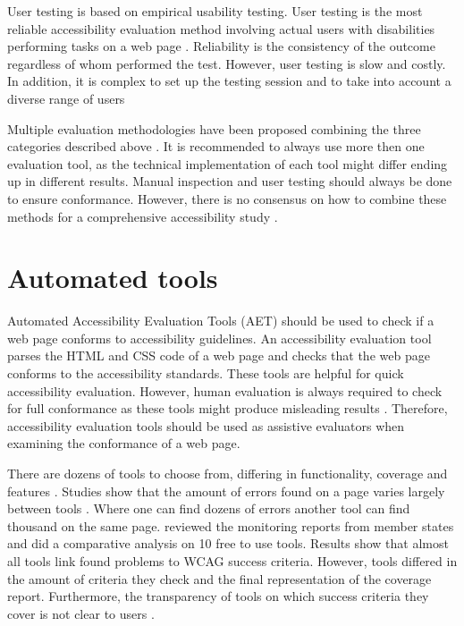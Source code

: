 User testing is based on empirical usability testing. User testing is the most reliable accessibility evaluation method involving actual users with disabilities performing tasks on a web page \citep[Chapter~26.2]{webaccessibility}. Reliability is the consistency of the outcome regardless of whom performed the test. However, user testing is slow and costly. In addition, it is complex to set up the testing session and to take into account a diverse range of users \citep{comparative_accessibility_methods}

Multiple evaluation methodologies have been proposed combining the three categories described above \citep[Chapter~26.2.1]{webaccessibility}. It is recommended to always use more then one evaluation tool, as the technical implementation of each tool might differ ending up in different results. Manual inspection and user testing should always be done to ensure conformance. However, there is no consensus on how to combine these methods for a comprehensive accessibility study \citep[Chapter~26.2.1]{webaccessibility}.

\section{Automated tools\label{automated_tools}}

Automated Accessibility Evaluation Tools (AET) should be used to check if a web page conforms to accessibility guidelines. An accessibility evaluation tool parses the HTML and CSS code of a web page and checks that the web page conforms to the accessibility standards. These tools are helpful for quick accessibility evaluation. However, human evaluation is always required to check for full conformance as these tools might produce misleading results \citep{wcagevaluationtools}. Therefore, accessibility evaluation tools should be used as assistive evaluators when examining the conformance of a web page.

There are dozens of tools to choose from, differing in functionality, coverage and features \citep{tool_list}. Studies show that the amount of errors found on a page varies largely between tools \citep{comparison_10.1145/3371300.3383346, comparison_10.1145/3607720.3607722, tool_analysis_directive}. Where one can find dozens of errors another tool can find thousand on the same page. \textcite{tool_analysis_directive} reviewed the monitoring reports from member states and did a comparative analysis on 10 free to use tools. Results show that almost all tools link found problems to WCAG success criteria. However, tools differed in the amount of criteria they check and the final representation of the coverage report. Furthermore, the transparency of tools on which success criteria they cover is not clear to users \citep{tool_analysis_directive}.

